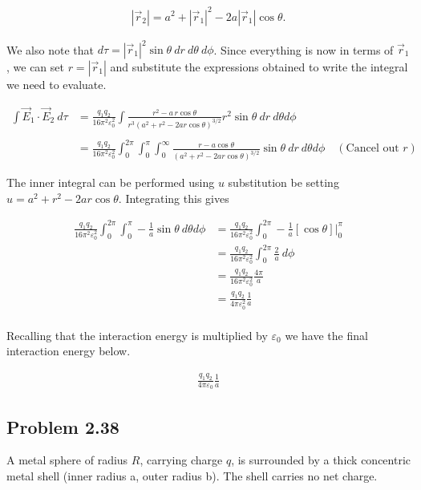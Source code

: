 \documentclass{article}
\newcommand{\rvec}[1]{\vec{r}_{#1}}
\begin{document}
\begin{align*}
    |\rvec{2}| = a^2 + |\rvec{1}|^2 - 2a|\rvec{1}|\cos\theta.
\end{align*}

We also note that $d\tau = |\rvec{1}|^2\sin\theta\ dr\ d\theta \ d\phi$. Since everything is now in terms of $\rvec{1}$, we can set $r = |\rvec{1}|$ and substitute the expressions obtained to write the integral we need to evaluate. 

\begin{align*}
    \int \vec{E}_1 \cdot \vec{E}_2\ d\tau &= \frac{q_1q_2}{16\pi^2\varepsilon^2_0} \int \frac{r^2 - a\,r\cos\theta}{r^3(a^2 + r^2 - 2ar\cos\theta)^{3/2}} r^2\sin\theta\ dr\ d\theta d\phi\\
\\
    &= \frac{q_1q_2}{16\pi^2\varepsilon^2_0} \int_0^{2\pi}\int_0^{\pi}\int_{0}^{\infty} \frac{r - a\cos\theta}{(a^2 + r^2 - 2ar\cos\theta)^{3/2}}\sin\theta\ dr\ d\theta d\phi \quad (\text{Cancel out } r)
\end{align*}

The inner integral can be performed using $u$ substitution be setting $u = a^2 + r^2 - 2ar\cos\theta$. Integrating this gives 

\begin{align*}
    \frac{q_1q_2}{16\pi^2\varepsilon^2_0} \int_0^{2\pi}\int_0^{\pi} -\frac{1}{a} \sin\theta \ d\theta d\phi &= \frac{q_1q_2}{16\pi^2\varepsilon^2_0} \int_0^{2\pi}-\frac{1}{a}[\cos\theta]\big|^{\pi}_0 \\
    &=\frac{q_1q_2}{16\pi^2\varepsilon^2_0} \int_0^{2\pi}\frac{2}{a}\ d\phi \\
    &= \frac{q_1q_2}{16\pi^2\varepsilon^2_0} \frac{4\pi}{a}\\
    &= \frac{q_1q_2}{4\pi\varepsilon^2_0} \frac{1}{a}\\
\end{align*}


Recalling that the interaction energy is multiplied by $\varepsilon_0$ we have the final interaction energy below. 

\begin{align*}
    \boxed{\frac{q_1q_2}{4\pi\varepsilon_0} \frac{1}{a}}
\end{align*}

\newpage

\subsection*{Problem 2.38} A metal sphere of radius $R$, carrying charge $q$, is surrounded by a thick concentric metal shell (inner radius a, outer radius b). The shell carries no net charge.
\end{document}
